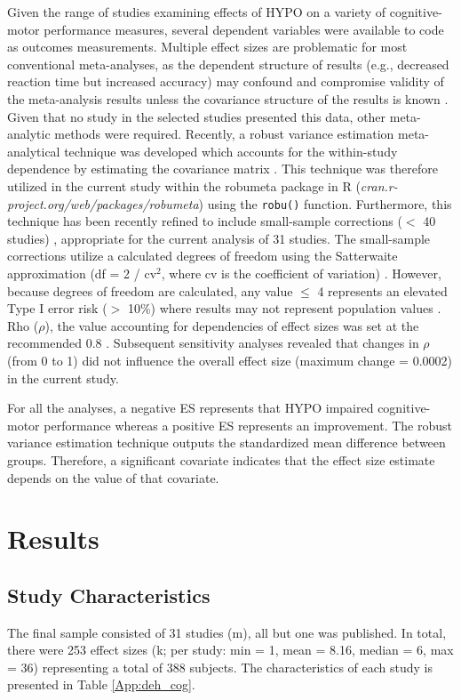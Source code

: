 Given the range of studies examining effects of HYPO on a variety of cognitive-motor performance measures, several dependent variables were available to code as outcomes measurements. Multiple effect sizes are problematic for most conventional meta-analyses, as the dependent structure of results (e.g., decreased reaction time but increased accuracy) may confound and compromise validity of the meta-analysis results unless the covariance structure of the results is known \cite{scammacca_meta-analysis_2014}. Given that no study in the selected studies presented this data, other meta-analytic methods were required. Recently, a robust variance estimation meta-analytical technique was developed which accounts for the within-study dependence by estimating the covariance matrix \cite{hedges_robust_2010}. This technique was therefore utilized in the current study within the robumeta package in R (\textit{cran.r-project.org/web/packages/robumeta}) using the \texttt{robu()} function. Furthermore, this technique has been recently refined to include small-sample corrections (${<}$ 40 studies) \cite{tipton_small_2015}, appropriate for the current analysis of 31 studies. The small-sample corrections utilize a calculated degrees of freedom using the Satterwaite approximation (df = 2 / cv${^2}$, where cv is the coefficient of variation) \cite{tipton_small_2015}. However, because degrees of freedom are calculated, any value ${\le}$ 4 represents an elevated Type I error risk (${>}$ 10\%) where results may not represent population values \cite{tipton_small_2015}. Rho (${\rho}$), the value accounting for dependencies of effect sizes was set at the recommended 0.8 \cite{tanner-smith_robust_2014}. Subsequent sensitivity analyses revealed that changes in ${\rho}$ (from 0 to 1) did not influence the overall effect size (maximum change = 0.0002) in the current study.

For all the analyses, a negative ES represents that HYPO impaired cognitive-motor performance whereas a positive ES represents an improvement. The robust variance estimation technique outputs the standardized mean difference between groups. Therefore, a significant covariate indicates that the effect size estimate depends on the value of that covariate.

\section{Results}

\subsection{Study Characteristics}
The final sample consisted of 31 studies (m), all but one \cite{kakos_improving_2013} was published. In total, there were 253 effect sizes (k; per study: min = 1, mean = 8.16, median = 6, max = 36) representing a total of 388 subjects. The characteristics of each study is presented in Table \ref{App:deh_cog}. 

